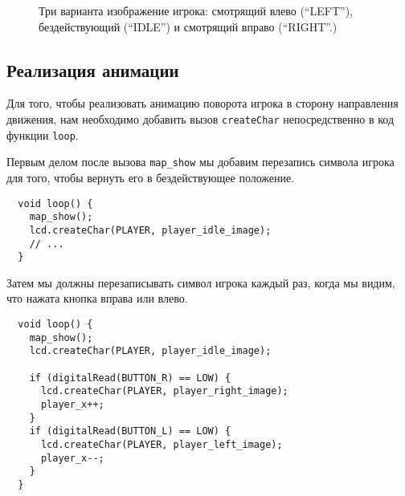 \documentclass[../sparc.tex]{subfiles}
\begin{document}
\begin{figure}[ht]
  \caption{Три варианта изображение игрока: смотрящий влево (``LEFT''),
    бездействующий (``IDLE'') и смотрящий вправо (``RIGHT''.)}
  \label{fig:game-dev-player-textures}
\end{figure}

\subsection{Реализация анимации}

Для того, чтобы реализовать анимацию поворота игрока в сторону направления
движения, нам необходимо добавить вызов \texttt{createChar} непосредственно в
код функции \texttt{loop}.

Первым делом после вызова \texttt{map\_show} мы добавим перезапись символа игрока
для того, чтобы вернуть его в бездействующее положение.

\begin{verbatim}
  void loop() {
    map_show();
    lcd.createChar(PLAYER, player_idle_image);
    // ...
  }
\end{verbatim}

Затем мы должны перезаписывать символ игрока каждый раз, когда мы видим, что
нажата кнопка вправа или влево.

\begin{verbatim}
  void loop() {
    map_show();
    lcd.createChar(PLAYER, player_idle_image);

    if (digitalRead(BUTTON_R) == LOW) {
      lcd.createChar(PLAYER, player_right_image);
      player_x++;
    }
    if (digitalRead(BUTTON_L) == LOW) {
      lcd.createChar(PLAYER, player_left_image);
      player_x--;
    }
  }
\end{verbatim}
\end{document}
